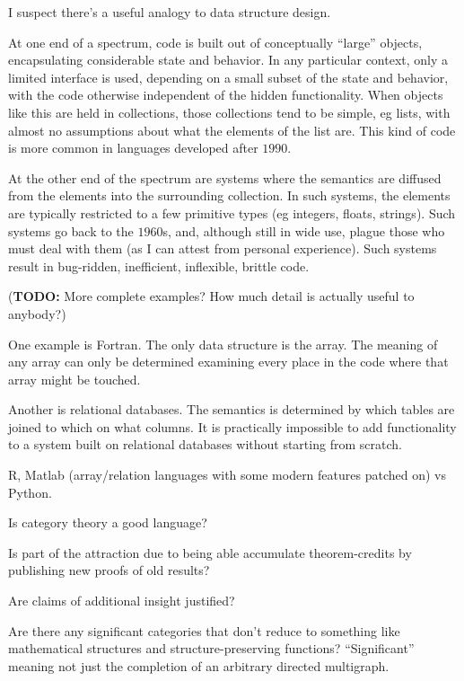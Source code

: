 \documentclass[11pt,openany]{book}
\begin{document}
I suspect there's a useful analogy to data structure design.

At one end of a spectrum, code is built out of conceptually 
``large'' objects, encapsulating considerable state and
behavior. In any particular context, only a limited interface
is used, depending on a small subset of the state and behavior,
with the code otherwise independent of the hidden functionality.
When objects like this are held in collections, those collections
tend to be simple, eg lists, with almost no assumptions
about what the elements of the list are.
This kind of code is more common in languages developed 
after $1990$.

At the other end of the spectrum are systems where the semantics
are diffused from the elements into the surrounding collection.
In such systems, the elements are typically restricted 
to a few primitive types (eg integers, floats, strings).
Such systems go back to the $1960$s, 
and, although still in wide use,
plague those who must deal with them (as I can attest from personal
experience).
Such systems result in bug-ridden, inefficient, 
inflexible, brittle code.

(\textbf{TODO:} More complete examples? 
How much detail is actually useful to anybody?)

One example is Fortran. The only data structure is the array.
The meaning of any array can only be determined examining every
place in the code where that array might be touched.

Another is relational databases. The semantics is determined
by which tables are joined to which on what columns.
It is practically impossible to add functionality to a system
built on relational databases without starting from scratch.

R, Matlab (array/relation languages with some modern features
patched on) vs Python.

\label{sec:Right-abstraction}

Is category theory a good language?~\cite{wiki_2020_abstract_nonsense}

Is part of the attraction due to being able accumulate
theorem-credits by publishing
new proofs of old results?

Are claims of additional insight justified?

Are there any significant categories 
that don't reduce to something like mathematical structures
and structure-preserving functions?
``Significant'' meaning not just the completion of an arbitrary
directed multigraph.
\end{document}
